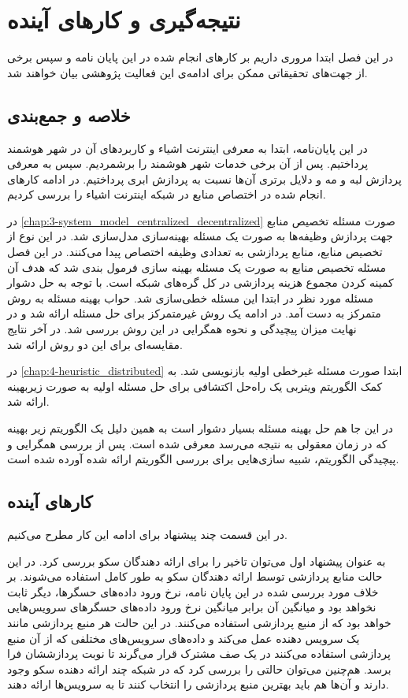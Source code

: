 \chapter{نتیجه‌گیری و کار‌های آینده}\label{chap:conclusion}
  \thispagestyle{empty}
  در این فصل ابتدا مروری داریم بر کار‌های انجام شده در این پایان نامه و سپس برخی از جهت‌های تحقیقاتی ممکن برای ادامه‌ی این فعالیت پژوهشی بیان خواهند شد.

  \section{خلاصه و جمع‌بندی}
    در این پایان‌نامه، ابتدا به معرفی اینترنت اشیاء و کاربرد‌های آن در شهر هوشمند پرداختیم.
    پس از آن برخی خدمات شهر هوشمند را برشمردیم.
    سپس به معرفی پردازش لبه و مه و دلایل برتری آن‌ها نسبت به پردازش ابری پرداختیم.
    در ادامه کار‌های انجام شده در اختصاص منابع در شبکه اینترنت اشیاء را بررسی کردیم.

    در \cref{chap:3-system_model_centralized_decentralized} صورت مسئله تخصیص منابع جهت پردازش وظیفه‌ها به صورت یک مسئله بهینه‌سازی مدل‌سازی شد. 
    در این نوع از تخصیص منابع، منابع پردازشی به تعدادی وظیفه اختصاص پیدا می‌کنند.
    در این فصل مسئله تخصیص منابع به صورت یک مسئله بهینه سازی فرمول بندی شد که هدف آن کمینه کردن مجموع هزینه پردازشی در کل گره‌های شبکه است.
    با توجه به حل دشوار مسئله مورد نظر در ابتدا این مسئله خطی‌سازی شد. حواب بهینه مسئله به روش متمرکز به دست آمد.
    در ادامه یک روش غیرمتمرکز برای حل مسئله ارائه شد و در نهایت میزان پیچیدگی و نحوه همگرایی در این روش بررسی شد. در آخر نتایج مقایسه‌ای برای این دو روش ارائه شد.

    در \cref{chap:4-heuristic_distributed} ابتدا صورت مسئله غیرخطی اولیه بازنویسی شد.
    به کمک الگوریتم ویتربی یک راه‌حل اکتشافی برای حل مسئله اولیه به صورت زیر‌بهینه ارائه شد. 


    در این جا هم حل بهینه مسئله بسیار دشوار است به همین دلیل یک الگوریتم زیر بهینه که در زمان معقولی به نتیجه می‌رسد معرفی شده است.
    پس از بررسی همگرایی و پیچیدگی الگوریتم، شبیه سازی‌هایی برای بررسی الگوریتم ارائه شده آورده شده است.

  \section{کار‌های آینده}
    در این قسمت چند پیشنهاد برای ادامه این کار مطرح می‌کنیم.
  
    به عنوان پیشنهاد اول می‌توان تاخیر را برای ارائه دهندگان سکو بررسی کرد.
    در این حالت منابع پردازشی توسط ارائه دهندگان سکو به طور کامل استفاده می‌شوند.
    بر خلاف مورد بررسی شده در این پایان نامه، نرخ ورود داده‌های حسگر‌ها، دیگر ثابت نخواهد بود و میانگین آن برابر میانگین نرخ ورود داده‌های حسگر‌های سرویس‌هایی خواهد بود که از منبع پردازشی استفاده می‌کنند.
    در این حالت هر منبع پردازشی مانند یک سرویس دهنده عمل می‌کند و داده‌های سرویس‌های مختلفی که از آن منبع پردازشی استفاده می‌کنند در یک صف مشترک قرار می‌گرند تا نوبت پردازششان فرا برسد.
    هم‌چنین می‌توان حالتی را بررسی کرد که در شبکه چند ارائه دهنده سکو وجود دارند و آن‌ها هم باید بهترین منبع پردازشی را انتخاب کنند تا به سرویس‌ها ارائه دهند.

